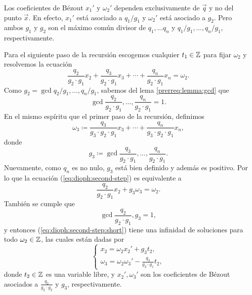 \begin{observation}
	Los coeficientes de Bézout $x_1'$ y $\omega_2'$ dependen exclusivamente de $\vec{q}$ y no del
	punto $\vec{x}$. En efecto, $x_1'$ está asociado a $q_1/g_1$ y $\omega_2'$ está asociado a
	$g_2$. Pero ambos $g_1$ y $g_2$ son el máximo común divisor de $q_1, \ldots q_n$ y
	$q_1/g_1, \ldots, q_n/g_1$, respectivamente. 
\end{observation}

Para el siguiente paso de la recursión escogemos cualquier $t_1 \in \mathbb{Z}$ para fijar $\omega_2$  y
resolvemos la ecuación
\begin{equation}
	\label{eq:dioph:second-step}
	\frac{q_2}{g_2 \cdot g_1}x_2 +
	\frac{q_3}{g_2 \cdot g_1}x_3 +
	\cdots +
	\frac{q_n}{g_2 \cdot g_1}x_n
	= \omega_2.
\end{equation}
Como $g_2 = \gcd{q_2/g_1, \ldots, q_n/g_1}$, sabemos del lema \ref{prerreq:lemma:gcd}
que
\begin{equation*}
	\gcd{\frac{q_2}{g_2 \cdot g_1}, \ldots, \frac{q_n}{g_2 \cdot g_1}} = 1.
\end{equation*}
En el mismo espíritu que el primer paso de la recursión, definimos
\begin{equation*}
	\omega_3 \coloneq \frac{q_3}{g_3 \cdot g_2 \cdot g_1}x_3 + \cdots + \frac{q_n}{g_3
	\cdot g_2 \cdot g_1}x_n,
\end{equation*}
donde
\begin{equation*}
	g_3 \coloneq  \gcd{\frac{q_3}{g_2 \cdot g_1}, \ldots, \frac{q_n}{g_2 \cdot g_1}}.
\end{equation*}
Nuevamente, como $q_n$ es no nulo, $g_3$ está bien definido y además es positivo. Por lo que la
ecuación (\ref{eq:dioph:second-step}) es equivalente a
\begin{equation}
	\label{eq:dioph:second-step:short}
	\frac{q_2}{g_2 \cdot g_1}x_2 + g_3\omega_3 = \omega_2.
\end{equation}
También se cumple que
\begin{equation*}
	\gcd{\frac{q_2}{g_2 \cdot g_1}, g_3} = 1,
\end{equation*}
y entonces (\ref{eq:dioph:second-step:short}) tiene una infinidad de soluciones para todo $\omega_2 \in
\mathbb{Z}$, las cuales están dadas por
\begin{equation*}
	\begin{cases}
		x_2 = \omega_2x_2' + g_3t_2, \\
		\omega_3 = \omega_2\omega_3' - \frac{q_2}{g_2 \cdot g_1}t_2,
	\end{cases}
\end{equation*}
donde $t_2 \in \mathbb{Z}$ es una variable libre, y $x_2', \omega_3'$ son los coeficientes de Bézout
asociados a $\frac{q_2}{g_2 \cdot g_2}$ y $g_3$, respectivamente.

